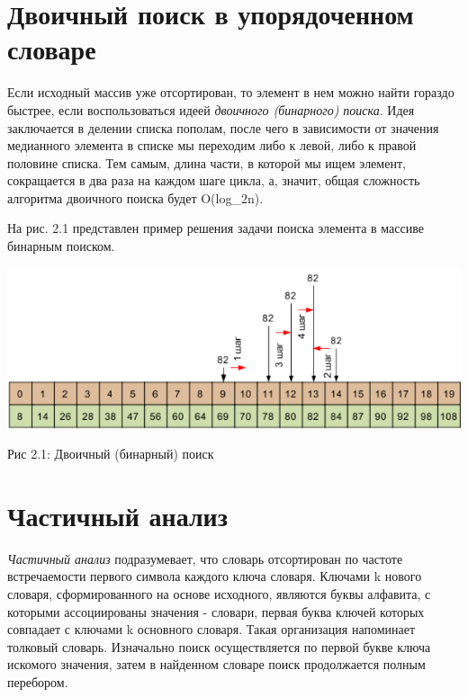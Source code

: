 \documentclass[12pt]{report}
\begin{document}
\section{Двоичный поиск в упорядоченном словаре}
Если исходный массив уже отсортирован, то элемент в нем можно найти гораздо быстрее, если воспользоваться идеей \textit{двоичного (бинарного) поиска}. Идея заключается в делении списка пополам, после чего в зависимости от значения медианного элемента в списке мы переходим либо к левой, либо к правой половине списка. Тем самым, длина части, в которой мы ищем элемент, сокращается в два раза на каждом шаге цикла, а, значит, общая сложность алгоритма двоичного поиска будет O(log_{2}n).

 На рис. 2.1 представлен пример решения задачи поиска элемента в массиве бинарным поиском.

\begin{center}
		\includegraphics[scale=1.9]{pics/BinSearch.png}
		
			Рис 2.1: Двоичный (бинарный) поиск
\end{center}

\section{Частичный анализ}
\textit{Частичный анализ} подразумевает, что словарь отсортирован по частоте встречаемости первого символа каждого ключа словаря. Ключами k нового словаря, сформированного на основе исходного, являются буквы алфавита, с которыми ассоциированы значения - словари, первая буква ключей которых совпадает с ключами k основного словаря. Такая организация напоминает толковый словарь. Изначально поиск осуществляется по первой букве ключа искомого значения, затем в найденном словаре поиск продолжается полным перебором. 
\end{document}
